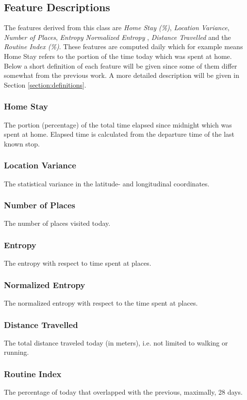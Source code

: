 \subsection{Feature Descriptions}
The features derived from this class are \textit{Home Stay (\%)}, \textit{Location Variance}, \textit{Number of Places}, \textit{Entropy} \textit{Normalized Entropy} , \textit{Distance Travelled} and the \textit{Routine Index (\%)}. These features are computed daily which for example means Home Stay refers to the portion of the time today which was spent at home. Below a short definition of each feature will be given since some of them differ somewhat from the previous work. A more detailed description will be given in Section \ref{section:definitions}.

\subsubsection*{Home Stay}
The portion (percentage) of the total time elapsed since midnight which was spent at home. Elapsed time is calculated from the departure time of the last known stop.

\subsubsection*{Location Variance}
The statistical variance in the latitude- and longitudinal coordinates.

\subsubsection*{Number of Places}
The number of places visited today.

\subsubsection*{Entropy}
The entropy with respect to time spent at places.

\subsubsection*{Normalized Entropy}
The normalized entropy with respect to the time spent at places.

\subsubsection*{Distance Travelled}
The total distance traveled today (in meters), i.e. not limited to walking or running.

\subsubsection*{Routine Index}
The percentage of today that overlapped with the previous, maximally, 28 days.